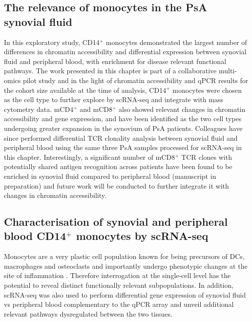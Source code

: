 \subsection{The relevance of monocytes in the PsA synovial fluid}
In this exploratory study, CD14$^+$ monocytes demonstrated the largest number of differences in chromatin accessibility and differential expression between synovial fluid and peripheral blood, with enrichment for disease relevant functional pathways. The work presented in this chapter is part of a collaborative multi-omics pilot study and in the light of chromatin accessibility and qPCR results for the cohort size available at the time of analysis, CD14$^+$ monocytes were chosen as the cell type to further explore by scRNA-seq and integrate with mass cytometry data. mCD4$^+$ and mCD8$^+$ also showed relevant changes in chromatin accessibility and gene expression, and have been identified as the two cell types undergoing greater expansion in the synovium of PsA patients. Colleagues have since performed differential TCR clonality analysis between synovial fluid and peripheral blood using the same three PsA samples processed for scRNA-seq in this chapter. Interestingly, a significant number of mCD8$^+$ TCR clones with potentially shared antigen recognition across patients have been found to be enriched in synovial fluid compared to peripheral blood (manuscript in preparation) and future work will be conducted to further integrate it with changes in chromatin accessibility.  

\subsection{Characterisation of synovial and peripheral blood CD14$^+$ monocytes by scRNA-seq}

Monocytes are a very plastic cell population known for being precursors of DCs, macrophages and osteoclasts and importantly undergo phenotypic changes at the site of inflammation \parencite{Qu2014,Rivollier2012}. Therefore interrogation at the single-cell level has the potential to reveal distinct functionally relevant subpopulations. In addition, scRNA-seq was also used to perform differential gene expression of synovial fluid vs peripheral blood complementary to the qPCR array and unveil additional relevant pathways dysregulated between the two tissues.

